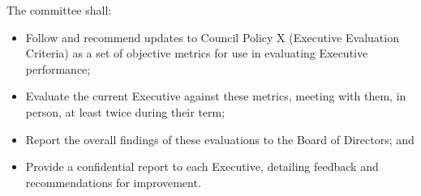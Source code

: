 The committee shall:
\begin{itemize}
    \item Follow and recommend updates to Council Policy X (Executive
        Evaluation Criteria) as a set of objective metrics for use in
        evaluating Executive performance;
    \item Evaluate the current Executive against these metrics, meeting with
        them, in person, at least twice during their term;
    \item Report the overall findings of these evaluations to the Board of
        Directors; and
    \item Provide a confidential report to each Executive, detailing feedback
        and recommendations for improvement.
\end{itemize}
